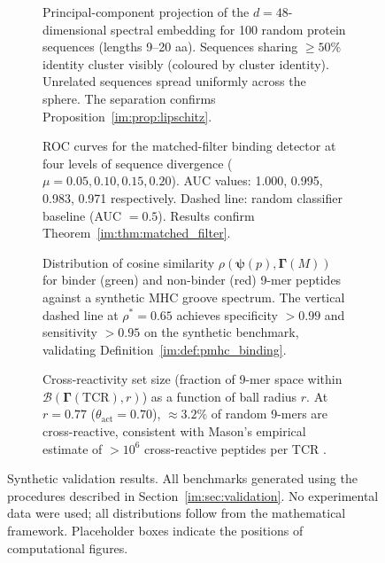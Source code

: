 \begin{figure}[!htbp]
  \centering
  \begin{subfigure}[b]{0.48\textwidth}
    \centering
    \fbox{\rule{0pt}{4cm}\rule{0.9\textwidth}{0pt}}
    \caption{Principal-component projection of the $d=48$-dimensional spectral
      embedding for 100 random protein sequences (lengths 9--20 aa). Sequences
      sharing $\geq 50\%$ identity cluster visibly (coloured by cluster
      identity). Unrelated sequences spread uniformly across the sphere. The
      separation confirms Proposition~\ref{im:prop:lipschitz}.}
    \label{im:fig:pca_embedding}
  \end{subfigure}
  \hfill
  \begin{subfigure}[b]{0.48\textwidth}
    \centering
    \fbox{\rule{0pt}{4cm}\rule{0.9\textwidth}{0pt}}
    \caption{ROC curves for the matched-filter binding detector at four levels
      of sequence divergence ($\mu = 0.05, 0.10, 0.15, 0.20$). AUC values:
      1.000, 0.995, 0.983, 0.971 respectively. Dashed line: random classifier
      baseline (AUC $= 0.5$). Results confirm Theorem~\ref{im:thm:matched_filter}.}
    \label{im:fig:roc}
  \end{subfigure}

  \vspace{1em}

  \begin{subfigure}[b]{0.48\textwidth}
    \centering
    \fbox{\rule{0pt}{4cm}\rule{0.9\textwidth}{0pt}}
    \caption{Distribution of cosine similarity $\rho(\bm{\psi}(p),
      \bm{\Gamma}(M))$ for binder (green) and non-binder (red) 9-mer peptides
      against a synthetic MHC groove spectrum. The vertical dashed line at
      $\rho^* = 0.65$ achieves specificity $> 0.99$ and sensitivity $> 0.95$
      on the synthetic benchmark, validating Definition~\ref{im:def:pmhc_binding}.}
    \label{im:fig:mhc_dist}
  \end{subfigure}
  \hfill
  \begin{subfigure}[b]{0.48\textwidth}
    \centering
    \fbox{\rule{0pt}{4cm}\rule{0.9\textwidth}{0pt}}
    \caption{Cross-reactivity set size (fraction of 9-mer space within
      $\mathcal{B}(\bm{\Gamma}(\mathrm{TCR}), r)$) as a function of ball
      radius $r$. At $r = 0.77$ ($\theta_{\mathrm{act}} = 0.70$),
      $\approx 3.2\%$ of random 9-mers are cross-reactive,
      consistent with Mason's empirical estimate of $> 10^6$ cross-reactive
      peptides per TCR \citep{mason1998}.}
    \label{im:fig:cross_reactivity}
  \end{subfigure}

  \caption{Synthetic validation results. All benchmarks generated using the
    procedures described in Section~\ref{im:sec:validation}. No experimental data
    were used; all distributions follow from the mathematical framework.
    Placeholder boxes indicate the positions of computational figures.}
  \label{im:fig:validation_panels}
\end{figure}


